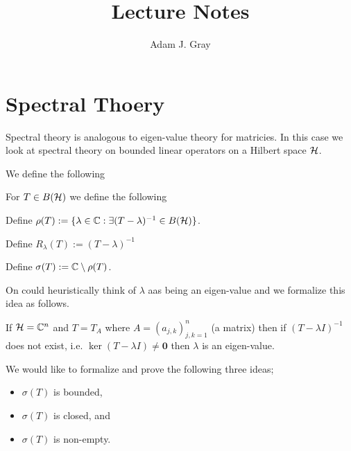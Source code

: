 \documentclass{unswmaths}
\begin{document}
\author{Adam J. Gray}
\title{Lecture Notes}
\subject{Functional Analysis}

\unswtitle

\section*{Spectral Thoery}

Spectral theory is analogous to eigen-value theory for matricies.
In this case we look at spectral theory on bounded linear operators on 
a Hilbert space $ \mathcal{H} $. 

We define the following

For $ T \in B( \mathcal{H} ) $ we define the following
\begin{definition}
	Define $ \rho(T) := \{ \lambda \in \mathbb{C} : \exists (T-\lambda)^{-1}  \in B( \mathcal{H} ) \} $.
\end{definition}
\begin{definition}[Resolvent]
	Define $ R_\lambda(T) := (T - \lambda)^{-1} $
\end{definition}
\begin{definition}[Spectrum]
	Define $ \sigma(T) := \mathbb{C} \setminus \rho(T) $.
\end{definition}

On could heuristically think of $ \lambda $ aas being an eigen-value and we formalize this idea as follows.

If $ \mathcal{H} = \mathbb{C}^n $ and $ T = T_A $ where $ A = \left( a_{j,k} \right)_{j,k=1}^n $ (a matrix) then 
if $ (T - \lambda I)^{-1} $ does not exist, i.e. $ \ker( T - \lambda I) \neq \mathbf{0} $ then $ \lambda $ is
an eigen-value.

We would like to formalize and prove the following three ideas;
\begin{itemize}
	\item $ \sigma(T) $ is bounded,
	\item $ \sigma(T) $ is closed, and
	\item $ \sigma(T) $ is non-empty.
\end{itemize}
\end{document}
